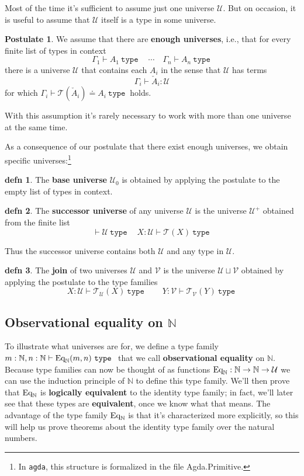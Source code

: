 \documentclass{amsart}
\theoremstyle{theorem}
\theoremstyle{definition}
\newtheorem*{defn}{defn}
\newtheorem*{post}{Postulate}
\theoremstyle{remark}
\newcommand{\0}{\mathbbe{0}}
\newcommand{\1}{\mathbbe{1}}
\newcommand{\2}{\mathbbe{2}}
\newcommand{\3}{\mathbbe{3}}
\newcommand{\4}{\mathbbe{4}}
\newcommand{\univ}{{~\texttt{type}~}}
\newcommand{\bN}{{\mathbb{N}}}
\newcommand{\UU}{\mathcal{U}}
\newcommand{\sT}{\mathcal{T}}
\newcommand{\Eq}{\textup{\text{Eq}}}
\begin{document}
Most of the time it's sufficient to assume just one universe $\UU$. But on occasion, it is useful to assume that $\UU$ itself is a type in some universe. 

\begin{post} We assume that there are \textbf{enough universes}, i.e., that for every finite list of types in context
\[ \Gamma_1 \vdash A_1 \univ \quad \cdots \quad \Gamma_n \vdash A_n \univ\]
there is a universe $\UU$ that contains each $A_i$ in the sense that $\UU$ has terms
\[ \Gamma_i \vdash \check{A}_i : \UU\] for which $\Gamma_i \vdash \sT(\check{A}_i) \doteq A_i \univ$ holds. 
\end{post}

With this assumption it's rarely necessary to work with more than one universe at the same time. 

As a consequence of our postulate that there exist enough universes, we obtain specific universes:\footnote{In \texttt{agda}, this structure is formalized in the file Agda.Primitive.}

\begin{defn} The \textbf{base universe} $\UU_0$ is obtained by applying the postulate to the empty list of types in context.
\end{defn}

\begin{defn} The \textbf{successor universe} of any universe $\UU$ is the universe $\UU^+$ obtained from the finite list
\[ \vdash \UU \univ \quad X: \UU \vdash \sT(X) \univ\]
\end{defn}
Thus the successor universe contains both $\UU$ and any type in $\UU$. 

\begin{defn} The \textbf{join} of two universes $\UU$ and $\mathcal{V}$ is the universe $\UU \sqcup \mathcal{V}$ obtained by applying the postulate to the type families
\[ X : \UU \vdash \sT_\UU(X) \univ \qquad Y : \mathcal{V} \vdash \sT_{\mathcal{V}}(Y) \univ\]
\end{defn}

\subsection*{Observational equality on \texorpdfstring{$\bN$}{N}}

To illustrate what universes are for, we define a type family $m : \bN, n : \bN \vdash \Eq_\bN(m,n) \univ$ that we call \textbf{observational equality} on $\bN$. Because type families can now be thought of as functions $\Eq_\bN : \bN \to \bN \to \UU$ we can use the induction principle of $\bN$ to define this type family.  We'll then prove that $\Eq_\bN$ is \textbf{logically equivalent} to the identity type family; in fact, we'll later see that these types are \textbf{equivalent}, once we know what that means. The advantage of the type family $\Eq_\bN$ is that it's characterized more explicitly, so this will help us prove theorems about the identity type family over the natural numbers.
\end{document}
